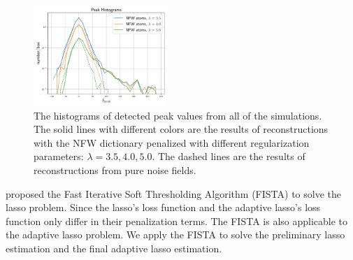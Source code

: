 \documentclass[twocolumn]{aastex62}
\begin{document}
\begin{figure}[!t]
 \centering
 \includegraphics[width=0.45\textwidth]{peak_histograms.pdf}
 \caption{The histograms of detected peak values from all of the simulations.
     The solid lines with different colors are the results of reconstructions
     with the NFW dictionary penalized with different regularization parameters:
     $\lambda=3.5,4.0,5.0$. The dashed lines are the results of reconstructions
     from pure noise fields.
    }\label{fig-peakHist}
\end{figure}

\citet{FISTA-Beck2009} proposed the Fast Iterative Soft Thresholding Algorithm
(FISTA) to solve the lasso problem.  Since the lasso's loss function and the
adaptive lasso's loss function only differ in their penalization terms. The
FISTA is also applicable to the adaptive lasso problem. We apply the FISTA to
solve the preliminary lasso estimation and the final adaptive lasso estimation.
\end{document}
